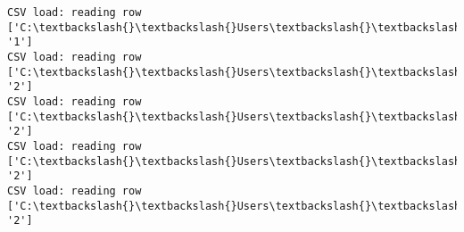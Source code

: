 \documentclass[11pt]{article}
\begin{document}
\begin{Verbatim}[commandchars=\\\{\}]
CSV load: reading row ['C:\textbackslash{}\textbackslash{}Users\textbackslash{}\textbackslash{}AbhishekGangadhar\textbackslash{}\textbackslash{}Downloads\textbackslash{}\textbackslash{}ActionRecog\textbackslash{}\textbackslash{}ActionRecog\textbackslash{}\textbackslash{}DataSets\textbackslash{}\textbackslash{}UCF11\textbackslash{}\textbackslash{}action\_youtube\_naudio\textbackslash{}\textbackslash{}golf\_swing\textbackslash{}\textbackslash{}v\_golf\_19\textbackslash{}\textbackslash{}v\_golf\_19\_06.avi', '1']
CSV load: reading row ['C:\textbackslash{}\textbackslash{}Users\textbackslash{}\textbackslash{}AbhishekGangadhar\textbackslash{}\textbackslash{}Downloads\textbackslash{}\textbackslash{}ActionRecog\textbackslash{}\textbackslash{}ActionRecog\textbackslash{}\textbackslash{}DataSets\textbackslash{}\textbackslash{}UCF11\textbackslash{}\textbackslash{}action\_youtube\_naudio\textbackslash{}\textbackslash{}trampoline\_jumping\textbackslash{}\textbackslash{}v\_jumping\_10\textbackslash{}\textbackslash{}v\_jumping\_10\_01.avi', '2']
CSV load: reading row ['C:\textbackslash{}\textbackslash{}Users\textbackslash{}\textbackslash{}AbhishekGangadhar\textbackslash{}\textbackslash{}Downloads\textbackslash{}\textbackslash{}ActionRecog\textbackslash{}\textbackslash{}ActionRecog\textbackslash{}\textbackslash{}DataSets\textbackslash{}\textbackslash{}UCF11\textbackslash{}\textbackslash{}action\_youtube\_naudio\textbackslash{}\textbackslash{}trampoline\_jumping\textbackslash{}\textbackslash{}v\_jumping\_10\textbackslash{}\textbackslash{}v\_jumping\_10\_02.avi', '2']
CSV load: reading row ['C:\textbackslash{}\textbackslash{}Users\textbackslash{}\textbackslash{}AbhishekGangadhar\textbackslash{}\textbackslash{}Downloads\textbackslash{}\textbackslash{}ActionRecog\textbackslash{}\textbackslash{}ActionRecog\textbackslash{}\textbackslash{}DataSets\textbackslash{}\textbackslash{}UCF11\textbackslash{}\textbackslash{}action\_youtube\_naudio\textbackslash{}\textbackslash{}trampoline\_jumping\textbackslash{}\textbackslash{}v\_jumping\_10\textbackslash{}\textbackslash{}v\_jumping\_10\_03.avi', '2']
CSV load: reading row ['C:\textbackslash{}\textbackslash{}Users\textbackslash{}\textbackslash{}AbhishekGangadhar\textbackslash{}\textbackslash{}Downloads\textbackslash{}\textbackslash{}ActionRecog\textbackslash{}\textbackslash{}ActionRecog\textbackslash{}\textbackslash{}DataSets\textbackslash{}\textbackslash{}UCF11\textbackslash{}\textbackslash{}action\_youtube\_naudio\textbackslash{}\textbackslash{}trampoline\_jumping\textbackslash{}\textbackslash{}v\_jumping\_10\textbackslash{}\textbackslash{}v\_jumping\_10\_04.avi', '2']

\end{Verbatim}
\end{document}
